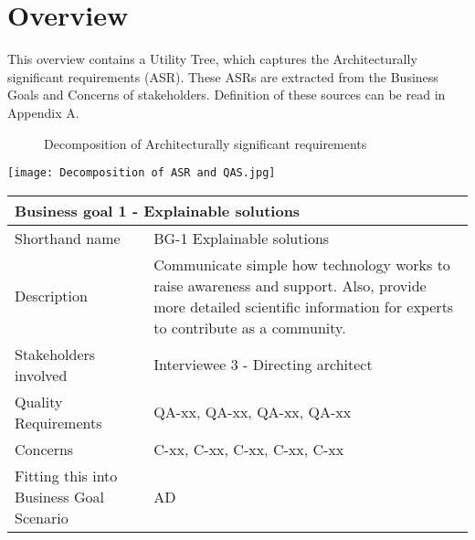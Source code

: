 \chapter{Overview}\label{s:overview}
This overview contains a Utility Tree, which captures the Architecturally significant requirements (ASR). These ASRs are extracted from the Business Goals and Concerns of stakeholders. Definition of these sources can be read in Appendix A.

\graphicspath{ {./images/} }
\begin{figure}[t]
\centering
\caption{Decomposition of Architecturally significant requirements}
\label{fig:mesh1}
\end{figure}

\texttt{[image: Decomposition of ASR and QAS.jpg]}



\begin{tabular}{ |p{3cm}||p{10cm}|}
 \hline
 \multicolumn{2}{|l|}{Business goal 1 - Explainable solutions} \\
 \hline
 Shorthand name   & BG-1 Explainable solutions    \\
 \hline
 Description &   Communicate simple how technology works to raise awareness and support. Also, provide more detailed scientific information for experts to contribute as a community.  \\
  \hline
 Stakeholders involved & Interviewee 3 - Directing architect  \\
  \hline
 Quality Requirements   & QA-xx, QA-xx, QA-xx, QA-xx \\
  \hline
 Concerns &   C-xx, C-xx, C-xx, C-xx, C-xx\\
  \hline
 Fitting this into Business Goal Scenario & AD \\
 \hline
\end{tabular}


